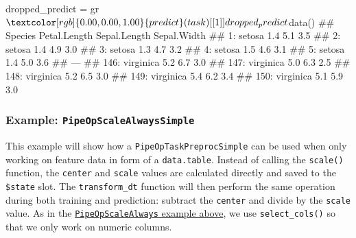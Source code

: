 \documentclass[
  11pt,
  parskip=half,
  DIV=calc,
  BCOR=10mm,
  x11names]{scrbook}
\newenvironment{Shaded}{}{}
\newcommand{\DecValTok}[1]{#1}
\newcommand{\KeywordTok}[1]{\textcolor[rgb]{0.00,0.00,1.00}{#1}}
\newcommand{\NormalTok}[1]{#1}
\newcommand{\OperatorTok}[1]{#1}
\newcommand{\StringTok}[1]{\textcolor[rgb]{0.00,0.50,0.50}{#1}}
\begin{document}
\begin{Shaded}
\begin{Highlighting}[]
\NormalTok{dropped_predict =}\StringTok{ }\NormalTok{gr}\OperatorTok{$}\KeywordTok{predict}\NormalTok{(task)[[}\DecValTok{1}\NormalTok{]]}

\NormalTok{dropped_predict}\OperatorTok{$}\KeywordTok{data}\NormalTok{()}
\NormalTok{##        Species Petal.Length Sepal.Length Sepal.Width}
\NormalTok{##   1:    setosa          1.4          5.1         3.5}
\NormalTok{##   2:    setosa          1.4          4.9         3.0}
\NormalTok{##   3:    setosa          1.3          4.7         3.2}
\NormalTok{##   4:    setosa          1.5          4.6         3.1}
\NormalTok{##   5:    setosa          1.4          5.0         3.6}
\NormalTok{##  ---                                                }
\NormalTok{## 146: virginica          5.2          6.7         3.0}
\NormalTok{## 147: virginica          5.0          6.3         2.5}
\NormalTok{## 148: virginica          5.2          6.5         3.0}
\NormalTok{## 149: virginica          5.4          6.2         3.4}
\NormalTok{## 150: virginica          5.1          5.9         3.0}
\end{Highlighting}
\end{Shaded}

\hypertarget{example-pipeopscalealwayssimple}{%
\subsubsection{\texorpdfstring{Example: \texttt{PipeOpScaleAlwaysSimple}}{Example: PipeOpScaleAlwaysSimple}}\label{example-pipeopscalealwayssimple}}

This example will show how a \texttt{PipeOpTaskPreprocSimple} can be used when only working on feature data in form of a \texttt{data.table}.
Instead of calling the \texttt{scale()} function, the \texttt{center} and \texttt{scale} values are calculated directly and saved to the \texttt{\$state} slot.
The \texttt{transform\_dt} function will then perform the same operation during both training and prediction: subtract the \texttt{center} and divide by the \texttt{scale} value.
As in the \protect\hyperlink{example-pipeopscalealways}{\texttt{PipeOpScaleAlways} example above}, we use \texttt{select\_cols()} so that we only work on numeric columns.
\end{document}
